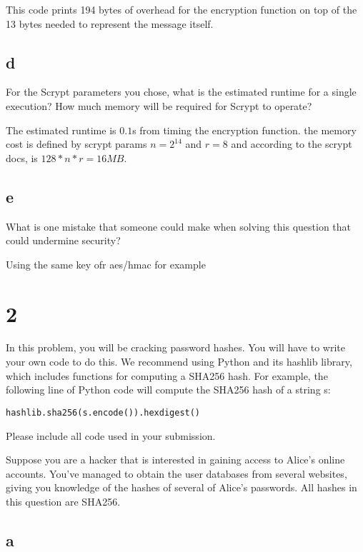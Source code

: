 \documentclass[11pt]{article}
\begin{document}
This code prints 194 bytes of overhead for the encryption function on top of the 13 bytes needed to represent the message itself.

\subsection{d}

For the Scrypt parameters you chose, what is the estimated runtime for a single execution? How much memory will be required for Scrypt to operate?

The estimated runtime is $0.1$s from timing the encryption function. the memory cost is defined by scrypt params $n=2^14$ and $r=8$ and according to the scrypt docs, is $128 * n * r = 16MB$.

\subsection{e}

What is one mistake that someone could make when solving this question that could undermine security?

Using the same key ofr aes/hmac for example

\newpage

\section{2}

In this problem, you will be cracking password hashes. You will have to write your own code to do this. We recommend using Python and its hashlib library, which includes functions for computing a SHA256 hash. For example, the following line of Python code will compute the SHA256 hash of a string s:

\begin{verbatim}
hashlib.sha256(s.encode()).hexdigest()
\end{verbatim}

Please include all code used in your submission.

Suppose you are a hacker that is interested in gaining access to Alice's online accounts. You've managed to obtain the user databases from several websites, giving you knowledge of the hashes of several of Alice's passwords. All hashes in this question are SHA256.

\subsection{a}
\end{document}
